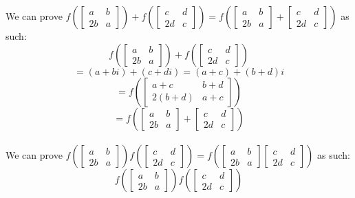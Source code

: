 \documentclass{article}
\begin{document}
\begin{enumerate}
We can prove
$f(\begin{bmatrix} a & b \\ 2b & a \end{bmatrix}) + f(\begin{bmatrix} c & d \\ 2d & c \end{bmatrix})
= f(\begin{bmatrix} a & b \\ 2b & a \end{bmatrix} + \begin{bmatrix} c & d \\ 2d & c \end{bmatrix})$
 as such:
 \[
 f(\begin{bmatrix} a & b \\ 2b & a \end{bmatrix}) + f(\begin{bmatrix} c & d \\ 2d & c \end{bmatrix})
 \] \[
 = (a + bi) + (c+di) = (a+c) + (b+d)i
 \] \[
 = f(\begin{bmatrix} a+c & b+d \\ 2(b+d) & a+c \end{bmatrix})
 \] \[
 = f(\begin{bmatrix} a & b \\ 2b & a \end{bmatrix} + \begin{bmatrix} c & d \\ 2d & c \end{bmatrix})
 \]
 \\
 We can prove
 $f(\begin{bmatrix} a & b \\ 2b & a \end{bmatrix})f(\begin{bmatrix} c & d \\ 2d & c \end{bmatrix})
 = f(\begin{bmatrix} a & b \\ 2b & a \end{bmatrix}\begin{bmatrix} c & d \\ 2d & c \end{bmatrix})$
 as such:
 \[
f(\begin{bmatrix} a & b \\ 2b & a \end{bmatrix})f(\begin{bmatrix} c & d \\ 2d & c \end{bmatrix})
\]
\end{enumerate}
\end{document}
